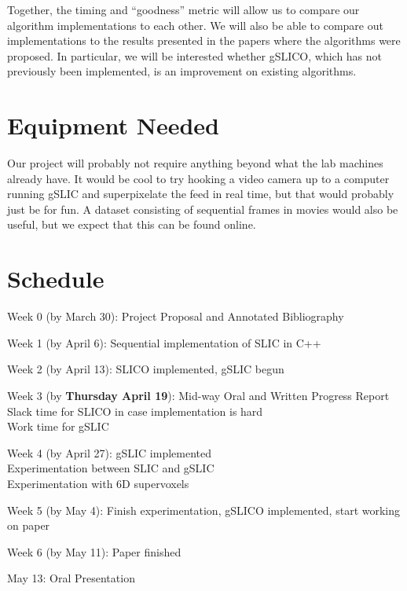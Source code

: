 \documentclass[11pt]{article}
\newenvironment{my_itemize}{
  \begin{itemize}
    \setlength{\itemsep}{1pt}
      \setlength{\parskip}{0pt}
\setlength{\parsep}{0pt}}{\end{itemize}
}
\begin{document}
Together, the timing and ``goodness'' metric will allow us to compare our algorithm implementations to each other. We will also be able to compare out implementations to the results presented in the papers where the algorithms were proposed. In particular, we will be interested whether gSLICO, which has not previously been implemented, is an improvement on existing algorithms.


\section {Equipment Needed}\label{equip}
Our project will probably not require anything beyond what the lab machines already have. It would be cool to try hooking a video camera up to a computer running gSLIC and superpixelate the feed in real time, but that would probably just be for fun. A dataset consisting of sequential frames in movies would also be useful, but we expect that this can be found online.

\section {Schedule}\label{sched}

\begin{my_itemize}
  \item Week 0 (by March 30): Project Proposal and Annotated Bibliography
  \item Week 1 (by April 6): Sequential implementation of SLIC in C++
  \item Week 2 (by April 13): SLICO implemented, gSLIC begun
  \item Week 3 (by \textbf{Thursday April 19}): Mid-way Oral and Written Progress Report \\\quad\quad Slack time for SLICO in case implementation is hard \\\quad\quad Work time for gSLIC
  \item Week 4 (by April 27): gSLIC implemented \\\quad\quad Experimentation between SLIC and gSLIC \\\quad\quad Experimentation with 6D supervoxels
  \item Week 5 (by May 4): Finish experimentation, gSLICO implemented, start working on paper
  \item Week 6 (by May 11): Paper finished
  \item May 13: Oral Presentation
\end{my_itemize}
\end{document}
